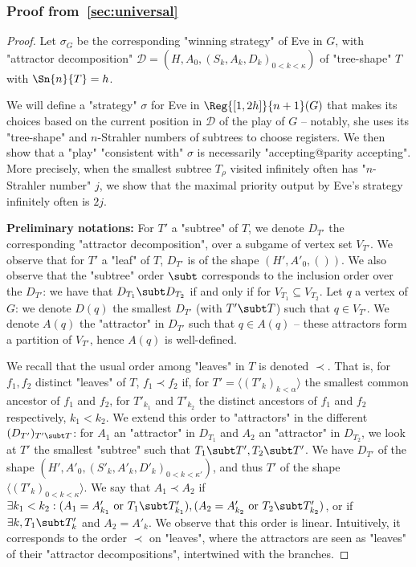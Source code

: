 \documentclass[a4paper,UKenglish,cleveref, autoref, thm-restate]{lipics-v2021}
\newcommand{\D}{\mathcal{D}}
\begin{document}
\subsubsection{Proof from~\cref{sec:universal}}\label{app:Strahler-to-Reg}

\strahlerToReg*

\begin{proof}
	Let $\sigma_G$ be the corresponding "winning strategy" of Eve in $G$, with "attractor decomposition" $\D = (H, A_0, (S_k,A_k,D_k)_{0<k<\kappa})$ of "tree-shape" $T$ with $\Sn{n}{T}=h$.
	
	We will define a "strategy" $\sigma$ for Eve in $\Reg{[1,2h]}{n+1}(G)$ that makes its choices based on the current position in $\D$ of the play of $G$ – notably, she uses its "tree-shape" and $n$-Strahler numbers of subtrees to choose registers. We then show that a "play" "consistent with" $\sigma$ is necessarily "accepting@parity accepting". More precisely, when the smallest subtree $T_\rho$ visited infinitely often has "$n$-Strahler number" $j$, we show that the maximal priority output by Eve's strategy infinitely often is $2j$.
	


	\textbf{Preliminary notations:} For $T'$ a "subtree" of $T$, we denote $D_{T'}$ the corresponding "attractor decomposition", over a subgame of vertex set $V_{T'}$. We observe that for $T'$ a "leaf" of $T$,  $D_{T'}$ is of the shape $(H',A'_0, ())$.
	We also observe that the "subtree" order $\subt$ corresponds to the inclusion order over the $D_{T'}$: we have that $D_{T_1} \subt D_{T_2}$ if and only if for $V_{T_1} \subseteq V_{T_2}$.
	Let $q$ a vertex of $G$: we denote $D(q)$ the smallest $D_{T'}$ (with $T' \subt T$) such that $q\in V_{T'}$. We denote $A(q)$ the "attractor" in $D_{T'}$ such that $q\in A(q)$ – these attractors form a partition of $V_{T'}$, hence $A(q)$ is well-defined.
	
	We recall that the usual order among "leaves" in $T$ is denoted $\prec$. That is, for $f_1,f_2$ distinct "leaves" of $T$, $f_1 \prec f_2$ if, for $T' = \langle (T'_k)_{k<\alpha}\rangle$ the smallest common ancestor of $f_1$ and $f_2$, for $T'_{k_1}$ and $T'_{k_2}$ the distinct ancestors of $f_1$ and $f_2$ respectively, $k_1 < k_2$.
	We extend this order to "attractors" in the different $(D_{T'})_{T'\subt T}$: for $A_1$ an "attractor" in $D_{T_1}$ and $A_2$ an "attractor" in $D_{T_2}$, we look at $T'$ the smallest "subtree" such that $T_1 \subt T', T_2\subt T'$. We have $D_{T'}$ of the shape $(H',A'_0, (S'_k, A'_k, D'_k)_{0<k<\kappa'})$, and thus $T'$ of the shape $\langle (T'_k)_{0<k<\kappa}\rangle$. We say that $A_1 \prec A_2$ if $\exists k_1<k_2: (A_1 = A'_{k_1} \text{ or } T_1 \subt T'_{k_1}), (A_2 = A'_{k_2} \text{ or } T_2 \subt T'_{k_2})$, or if $\exists k, T_1 \subt T'_{k}$ and $A_2 = A'_k$. We observe that this order is linear.
	Intuitively, it corresponds to the order $\prec$ on "leaves", where the attractors are seen as "leaves" of their "attractor decompositions", intertwined with the branches.
	

\end{proof}
\end{document}
